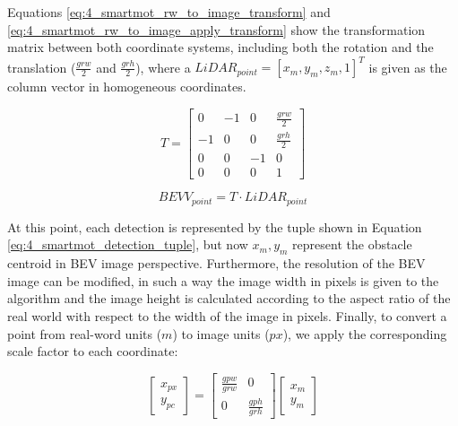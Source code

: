 Equations \ref{eq:4_smartmot_rw_to_image_transform} and \ref{eq:4_smartmot_rw_to_image_apply_transform} show the transformation matrix between both coordinate systems, including both the rotation and the translation (\textit{$\frac{grw}{2}$} and \textit{$\frac{grh}{2}$}), where a $LiDAR_{point}=[x_{m},y_{m},z_{m},1]^{T}$ is given as the column vector in homogeneous coordinates.

\begin{equation}
	\label{eq:4_smartmot_rw_to_image_transform}
	T = \left[ \begin{array}{cccc}
		0  &  -1 &  0  &  \frac{grw}{2} \\
		-1 &  0  &  0  &  \frac{grh}{2} \\
		0  &  0  &  -1 &  0            \\
		0  &  0  &  0  &  1 \end{array} \right] 
\end{equation}

\begin{equation}
	\label{eq:4_smartmot_rw_to_image_apply_transform}
	BEVV_{point} = T \cdot LiDAR_{point}
\end{equation}

At this point, each detection is represented by the tuple shown in Equation \ref{eq:4_smartmot_detection_tuple}, but now \textit{$x_{m},y_{m}$} represent the obstacle centroid in \ac{BEV} image perspective. Furthermore, the resolution of the \ac{BEV} image can be modified, in such a way the image width in pixels is given to the algorithm and the image height is calculated according to the aspect ratio of the real world with respect to the width of the image in pixels. Finally, to convert a point from real-word units ($\textit{m}$) to image units ($\textit{px}$), we apply the corresponding scale factor to each coordinate:

\begin{equation}
	\label{eq:4_conversion_meter2px}
	\left[ \begin{array}{c}
		x_{px}  \\
		y_{pc} \end{array} \right] 
	=
	\left[ \begin{array}{cc}
		\frac{gpw}{grw} & 0  \\
		0 & \frac{gph}{grh} \end{array} \right]
	\left[ \begin{array}{c}
		x_{m}  \\
		y_{m} \end{array} \right] 
\end{equation}

